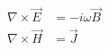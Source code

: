 \begin{equation}
\begin{split}
    \nabla \times \vec{E} &= -i \omega\vec{B}  \\
    \nabla \times \vec{H} &= \vec{J}
\end{split}
\label{eq:maxwell_freq_quasi}
\end{equation}
